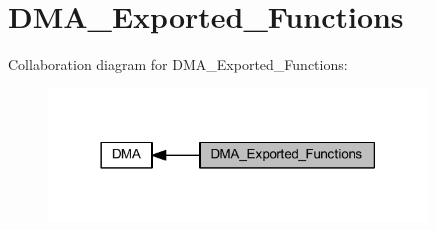 \hypertarget{group___d_m_a___exported___functions}{}\section{D\+M\+A\+\_\+\+Exported\+\_\+\+Functions}
\label{group___d_m_a___exported___functions}
Collaboration diagram for D\+M\+A\+\_\+\+Exported\+\_\+\+Functions\+:
\nopagebreak
\begin{figure}[H]
\begin{center}
\leavevmode
\includegraphics[width=285pt]{group___d_m_a___exported___functions}
\end{center}
\end{figure}
